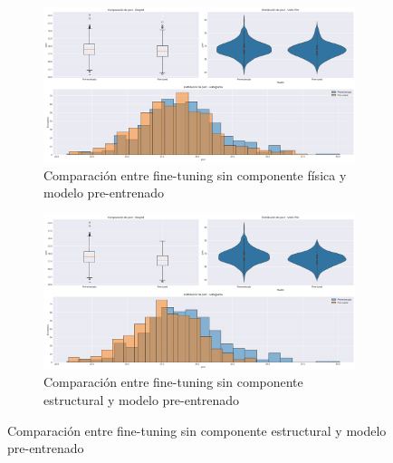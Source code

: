 \begin{figure}[H]
    \centering
    \begin{subfigure}[b]{0.48\textwidth}
        \centering
        \includegraphics[width=\textwidth]{Images/comparison_plots_psnr_no_phy.png}
        \caption{Comparación entre fine-tuning sin componente física y modelo pre-entrenado}
        \label{fig:psnr_hist}
    \end{subfigure}
    \hfill
    \begin{subfigure}[b]{0.48\textwidth}
        \centering
        \includegraphics[width=\textwidth]{Images/comparison_plots_psnr_no_struct.png}
        \caption{Comparación entre fine-tuning sin componente estructural y modelo pre-entrenado}
        \label{fig:psnr_violin}
    \end{subfigure}
    
    \vspace{0.5cm}
    

\end{figure}

